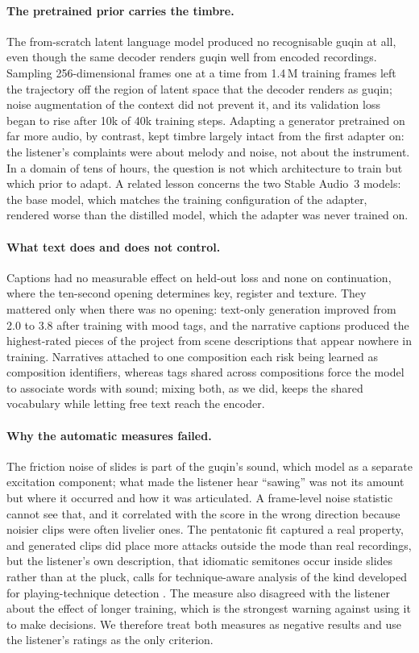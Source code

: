 \paragraph{The pretrained prior carries the timbre.} The from-scratch latent language model produced no recognisable
guqin at all, even though the same decoder renders guqin well from encoded recordings. Sampling 256-dimensional frames
one at a time from 1.4\,M training frames left the trajectory off the region of latent space that the decoder renders
as guqin; noise augmentation of the context did not prevent it, and its validation loss began to rise after 10k of
40k training steps. Adapting a generator pretrained on far more audio, by contrast, kept timbre largely intact from
the first adapter on: the listener's complaints were about melody and noise, not about the instrument. In a domain of
tens of hours, the question is not which architecture to train but which prior to adapt. A related lesson concerns the
two Stable Audio~3 models: the base model, which matches the training configuration of the adapter, rendered worse
than the distilled model, which the adapter was never trained on.

\paragraph{What text does and does not control.} Captions had no measurable effect on held-out loss and none on
continuation, where the ten-second opening determines key, register and texture. They mattered only when there was no
opening: text-only generation improved from 2.0 to 3.8 after training with mood tags, and the narrative captions
produced the highest-rated pieces of the project from scene descriptions that appear nowhere in training. Narratives
attached to one composition each risk being learned as composition identifiers, whereas tags shared across
compositions force the model to associate words with sound; mixing both, as we did, keeps the shared vocabulary
while letting free text reach the encoder.

\paragraph{Why the automatic measures failed.} The friction noise of slides is part of the guqin's sound, which
\cite{penttinen2006guqin} model as a separate excitation component; what made the listener hear ``sawing'' was not its
amount but where it occurred and how it was articulated. A frame-level noise statistic cannot see that, and it
correlated with the score in the wrong direction because noisier clips were often livelier ones. The pentatonic fit
captured a real property, and generated clips did place more attacks outside the mode than real recordings, but the
listener's own description, that idiomatic semitones occur inside slides rather than at the pluck, calls for
technique-aware analysis of the kind developed for playing-technique detection
\citep{huang2020guqin,li2022guzheng}. The measure also disagreed with the listener about the effect of longer
training, which is the strongest warning against using it to make decisions. We therefore treat both measures as
negative results and use the listener's ratings as the only criterion.

